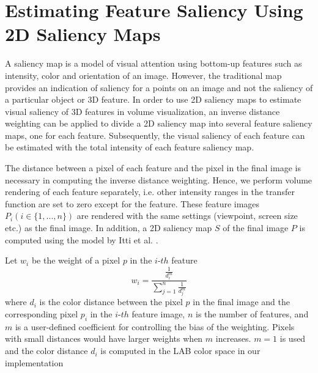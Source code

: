 \chapter{Estimating Feature Saliency Using 2D Saliency Maps \label{2d_saliency_map}}

A saliency map is a model of visual attention using bottom-up features such as intensity, color and orientation of an image.
However, the traditional map provides an indication of saliency for a points on an image and not the saliency of a particular object or 3D feature.
In order to use 2D saliency maps \cite{itti_model_1998} to estimate visual saliency of 3D features in volume visualization, an inverse distance weighting \cite{shepard_two-dimensional_1968} can be applied to divide a 2D saliency map into several feature saliency maps, one for each feature. Subsequently, the visual saliency of each feature can be estimated with the total intensity of each feature saliency map.

The distance between a pixel of each feature and the pixel in the final image is necessary in computing the inverse distance weighting.
Hence, we perform volume rendering of each feature separately, i.e. other intensity ranges in the transfer function are set to zero except for the feature.
These feature images $ P_{i} (i \in \{1,...,n\})$ are rendered with the same settings (viewpoint, screen size etc.) as the final image.
In addition, a 2D saliency map $ S $ of the final image $ P $ is computed using the model by Itti et al. \cite{itti_model_1998}.

Let $ w_{i} $ be the weight of a pixel $ p $ in the $i$-$th$ feature
\[ w_{i} = \frac{ \frac{1}{d_{i}^{m}} }{ \sum_{j=1}^{n} \frac{1}{d_{j}^{m}} } \]
where $ d_{i} $ is the color distance between the pixel $ p $ in the final image and the corresponding pixel $ p_{i} $ in the $i$-$th$ feature image,
$ n $ is the number of features, and
$ m $ is a user-defined coefficient for controlling the bias of the weighting. Pixels with small distances would have larger weights when $ m $ increases. $ m=1 $ is used and the color distance $ d_{i} $ is computed in the LAB color space in our implementation

